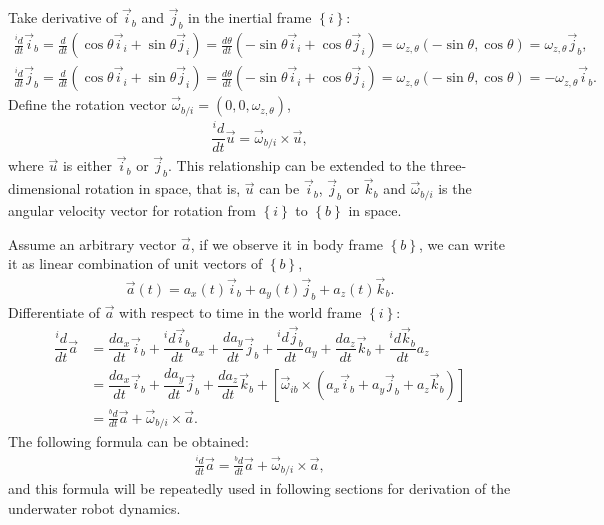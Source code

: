 Take derivative of $\vec{i}_{b}$ and $\vec{j}_{b}$ in the inertial frame $\left\{ i \right\}$:
\begin{align}
\frac{^{i}d}{dt}\vec{i}_{b}=\frac{d}{dt}(\cos\theta\vec{i}_{i}+\sin\theta\vec{j}_{i})
=\frac{d\theta}{dt}(-\sin\theta\vec{i}_{i}+\cos\theta\vec{j}_{i})
=\omega_{z,\theta}\left(-\sin\theta,\cos\theta\right)=\omega_{z,\theta}\vec{j}_{b},
\end{align}
\begin{align}
\frac{^{i}d}{dt}\vec{j}_{b}=\frac{d}{dt}(\cos\theta\vec{i}_{i}+\sin\theta\vec{j}_{i})
=\frac{d\theta}{dt}(-\sin\theta\vec{i}_{i}+\cos\theta\vec{j}_{i})
=\omega_{z,\theta}\left(-\sin\theta,\cos\theta\right)=-\omega_{z,\theta}\vec{i}_{b}.
\end{align}
Define the rotation vector $\vec{\omega}_{b/i}=(0, 0, \omega_{z,\theta})$,
\begin{align}
 \dfrac{^{i}d}{dt}\vec{u}=\vec{\omega}_{b/i}\times \vec{u},
 \end{align} 
where $\vec{u}$ is either $\vec{i}_{b}$ or $\vec{j}_{b}$. This relationship can be extended to the three-dimensional rotation in space, that is, $\vec{u}$ can be $\vec{i}_{b}$, $\vec{j}_{b}$ or $\vec{k}_{b}$ and $\vec{\omega}_{b/i}$ is the angular velocity vector for rotation from $\left\{ i \right\}$ to $\left\{ b \right\}$ in space.

Assume an arbitrary vector $\vec{a}$, if we observe it in body frame $\left\{ b \right\}$, we can write it as linear combination of unit vectors of $\left\{ b \right\}$,
\begin{align}
\vec{a}(t)=a_{x}(t)\vec{i}_{b}+a_{y}(t)\vec{j}_{b}+a_{z}(t)\vec{k}_{b}.
\end{align} 
Differentiate of $\vec{a}$ with respect to time in the world frame $\left\{ i \right\}$:
\begin{align}
\dfrac{^{i}d}{dt}\vec{a}&=\dfrac{d a_{x}}{dt}\vec{i}_{b}+\dfrac{^{i}d\vec{i}_{b}}{dt}a_{x}+\dfrac{d a_{y}}{dt}\vec{j}_{b}+\dfrac{^{i}d\vec{j}_{b}}{dt}a_{y}+\dfrac{d a_{z}}{dt}\vec{k}_{b}+\dfrac{^{i}d\vec{k}_{b}}{dt}a_{z} \nonumber \\
&=\dfrac{d a_{x}}{dt}\vec{i}_{b}+\dfrac{d a_{y}}{dt}\vec{j}_{b}+\dfrac{d a_{z}}{dt}\vec{k}_{b}+[\vec{\omega}_{ib}\times
(a_{x}\vec{i}_{b}+a_{y}\vec{j}_{b}+a_{z}\vec{k}_{b})] \nonumber \\
&=\frac{^{b}d}{dt}\vec{a}+\vec{\omega}_{b/i}\times \vec{a}.
\end{align}
The following formula can be obtained:
\begin{align}
\frac{^{i}d}{dt}\vec{a}=\frac{^{b}d}{dt}\vec{a}+\vec{\omega}_{b/i}\times \vec{a}\label{EQ:VectorDerivative},
\end{align}
and this formula will be repeatedly used in following sections for derivation of the underwater robot dynamics.

